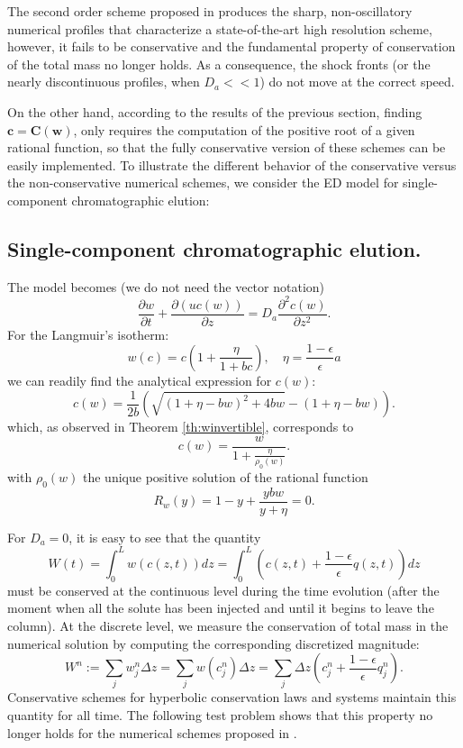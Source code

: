 \documentclass[preprint]{elsarticle}
\theoremstyle{definition}
\newcommand{\bw}{\boldsymbol w}
\newcommand{\bc}{\boldsymbol c}
\newcommand{\bC}{\boldsymbol C}
\begin{document}
The second order scheme proposed in \cite{Javeed} produces the  sharp,
non-oscillatory numerical profiles that characterize a
state-of-the-art high resolution scheme, however,  it  
fails to be conservative and the fundamental property of conservation of
the total mass no longer holds. As a consequence,    the shock
fronts (or the nearly discontinuous profiles, when $D_a<<1$) do not
move at the correct speed. 

On the other hand, according to the results of
the previous section, finding
 $\bc=\bC(\bw)$, only requires the computation of
 the  positive 
 root of a given rational function, so that the fully conservative
 version of these schemes can be easily implemented. 
 To illustrate the different behavior of the conservative versus the
 non-conservative numerical schemes, we consider the
ED model for single-component chromatographic elution:

\subsection{Single-component chromatographic elution.}\label{subsec:single}

 The model becomes (we do not need the vector notation) 
\begin{equation*}\frac{\partial  w}{\partial t}+\frac{\partial (u  c(w))}{\partial z}=D_a \frac{\partial^2  c(w)}{\partial z^2}.
\end{equation*}
For the Langmuir's isotherm:
\begin{equation*}w(c)=c \left(1+\frac{\eta }{1+bc}\right), \quad \eta=
\frac{1-\epsilon}{\epsilon} a
\end{equation*}
we can readily find
the  analytical expression for $c(w)$:
\begin{equation*}c(w)=\frac{1}{2b} \left(\sqrt{(1+\eta -bw)^2+4bw}-(1+\eta  -bw)\right).
\end{equation*}
which, as observed in Theorem \ref{th:winvertible},  corresponds to 
\[ c(w)=\frac{w}{1+\frac{\eta }{\rho_0(w)}}. \]
with $\rho_0(w)$ the unique  positive solution of the rational function
\[ R_w(y)=1-y+\frac{y bw}{y+\eta }=0. \]

For $D_a=0$, it is easy to see that  the quantity
\[ W(t)=\int_0^L w(c(z,t)) dz=\int_0^L \left( c(z,t)+\frac{1-\epsilon}{\epsilon} q(z,t)\right) dz\]
must be conserved at the continuous level during the  time evolution (after the moment when
all the solute has been injected and until it begins to leave the
column).
At the discrete level, we measure the conservation of total mass in the numerical solution  by computing the corresponding discretized magnitude:
\begin{equation} \label{eq:consWn}
 W^n:=\sum_j w_j^n\Delta z =\sum_j w(c_j^n)\Delta z = \sum_j \Delta z \left(
  c_j^n+\frac{1-\epsilon}{\epsilon} q_j^n\right).
\end{equation}
 Conservative schemes for hyperbolic conservation laws and systems
 maintain this quantity for all time.
 The following  test problem
shows that this
property no longer holds for the numerical schemes proposed in \cite{Javeed}.
\end{document}
